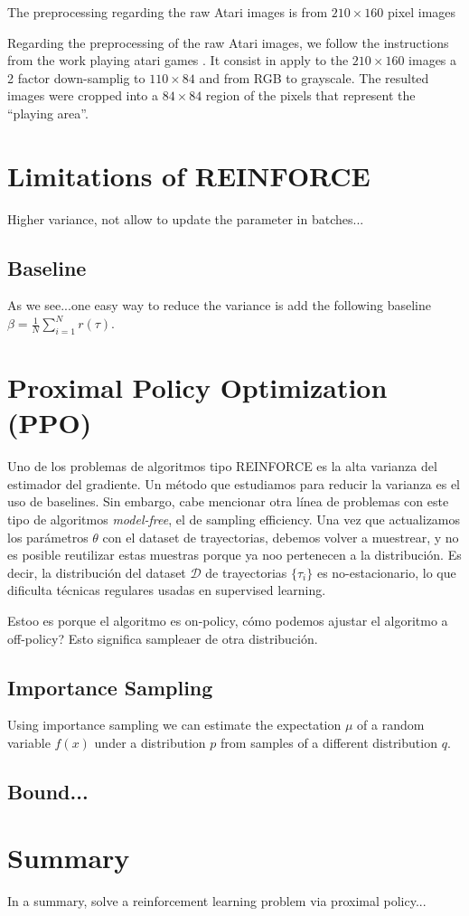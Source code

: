 The preprocessing regarding the raw Atari images is from $210\times 160$ pixel 
images

Regarding the preprocessing of the raw Atari images, we follow the instructions
from the work playing atari games \cite{mnih2013playing}. It consist in
apply to the $210\times 160$ images a 2 factor down-samplig to $110\times 84$
and from RGB to grayscale. The resulted images were cropped into a $84\times84$
region of the pixels that represent the ``playing area''.

\section{Limitations of REINFORCE}

Higher variance, not allow to update the parameter in batches...

\subsection{Baseline}

As we see...one easy way to reduce the variance is add the following
baseline $\beta=\frac{1}{N}\sum_{i=1}^{N} r(\tau)$.

\section{Proximal Policy Optimization (PPO)}

Uno de los problemas de algoritmos tipo REINFORCE es la alta varianza del
estimador del gradiente. Un método que estudiamos para reducir la varianza
es el uso de baselines. Sin embargo, cabe mencionar otra línea de problemas
con este tipo de algoritmos \textit{model-free}, el de sampling efficiency. Una
vez que actualizamos los parámetros $\theta$ con el dataset de trayectorias,
debemos volver a muestrear, y no es posible reutilizar estas muestras porque
ya noo pertenecen a la distribución. Es decir, la distribución del dataset
$\mathcal{D}$ de trayectorias $\{\tau_i\}$ es no-estacionario, lo que dificulta
técnicas regulares usadas en supervised learning.

Estoo es porque el algoritmo es on-policy, cómo podemos ajustar el
algoritmo a off-policy? Esto significa sampleaer de otra distribución.


\subsection{Importance Sampling}


Using importance sampling we can estimate the expectation $\mu$ of a random
variable $f(x)$ under a distribution $p$ from samples of a different 
distribution $q$. 


\subsection{Bound...}

\section{Summary}

In a summary, solve a reinforcement learning problem
via proximal policy...